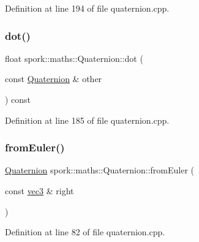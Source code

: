 Definition at line 194 of file quaternion.\+cpp.

\mbox{\label{structspork_1_1maths_1_1_quaternion_a8ef8908ae0daefd7de38e6560c822b1f}} 
\subsubsection{\texorpdfstring{dot()}{dot()}}
{\footnotesize\ttfamily float spork\+::maths\+::\+Quaternion\+::dot (\begin{DoxyParamCaption}\item[{const \hyperlink{structspork_1_1maths_1_1_quaternion}{Quaternion} \&}]{other }\end{DoxyParamCaption}) const}



Definition at line 185 of file quaternion.\+cpp.

\mbox{\label{structspork_1_1maths_1_1_quaternion_a45e3e18757f677e4c4b0207eafaa4751}} 
\subsubsection{\texorpdfstring{from\+Euler()}{fromEuler()}}
{\footnotesize\ttfamily \hyperlink{structspork_1_1maths_1_1_quaternion}{Quaternion} spork\+::maths\+::\+Quaternion\+::from\+Euler (\begin{DoxyParamCaption}\item[{const \hyperlink{structspork_1_1maths_1_1vec3}{vec3} \&}]{right }\end{DoxyParamCaption})\hspace{0.3cm}{\ttfamily [static]}}



Definition at line 82 of file quaternion.\+cpp.

\mbox{\label{structspork_1_1maths_1_1_quaternion_a67ced3bf831b837b22f927f86d0239fa}} 

